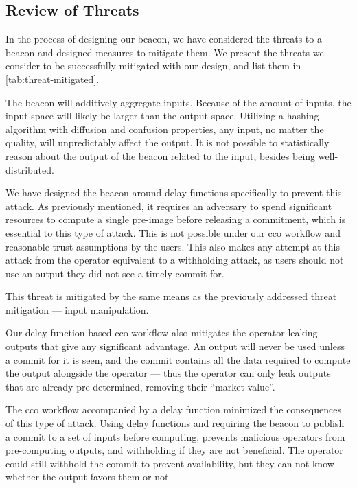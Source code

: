 \subsection{Review of Threats}
In the process of designing our beacon, we have considered the threats to a beacon and designed measures to mitigate them.
We present the threats we consider to be successfully mitigated with our design, and list them in \vref{tab:threat-mitigated}.

The beacon will additively aggregate inputs.
Because of the amount of inputs, the input space will likely be larger than the output space.
Utilizing a hashing algorithm with diffusion and confusion properties, any input, no matter the quality, will unpredictably affect the output.
It is not possible to statistically reason about the output of the beacon related to the input, besides being well-distributed.

We have designed the beacon around delay functions specifically to prevent this attack.
As previously mentioned, it requires an adversary to spend significant resources to compute a single pre-image before releasing a commitment, which is essential to this type of attack.
This is not possible under our \gls{cco} workflow and reasonable trust assumptions by the users.
This also makes any attempt at this attack from the operator equivalent to a withholding attack, as users should not use an output they did not see a timely commit for.

This threat is mitigated by the same means as the previously addressed threat mitigation --- input manipulation.

Our delay function based \gls{cco} workflow also mitigates the operator leaking outputs that give any significant advantage.
An output will never be used unless a commit for it is seen, and the commit contains all the data required to compute the output alongside the operator --- thus the operator can only leak outputs that are already pre-determined, removing their \enquote{market value}.

The \gls{cco} workflow accompanied by a delay function minimized the consequences of this type of attack.
Using delay functions and requiring the beacon to publish a commit to a set of inputs before computing, prevents malicious operators from pre-computing outputs, and withholding if they are not beneficial.
The operator could still withhold the commit to prevent availability, but they can not know whether the output favors them or not.

